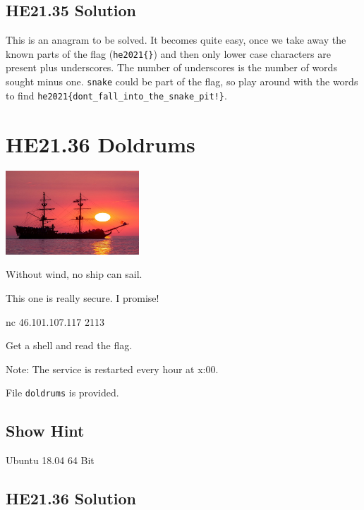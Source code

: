 \documentclass[english,a4paper,nols,noindent]{tufte-handout}
\begin{document}
\hypertarget{he21.35-solution}{%
\subsection{HE21.35 Solution}\label{he21.35-solution}}

\noindent This is an anagram to be solved.
It becomes quite easy, once we take away the known parts of the flag
(\verb+he2021{}+) and then only lower case characters are present plus
underscores.  The number of underscores is the number of words sought minus
one.  \verb+snake+ could be part of the flag, so play around with the words to find
\verb+he2021{dont_fall_into_the_snake_pit!}+.



\hypertarget{he21.36}{%
\section{HE21.36 Doldrums}
  \label{he21.36}}
\begin{marginfigure}
    \includegraphics[width=50mm]{images/challenge36.jpg}
\end{marginfigure}

\noindent Without wind, no ship can sail.

This one is really secure. I promise!

nc 46.101.107.117 2113

Get a shell and read the flag.

Note: The service is restarted every hour at x:00.

File \verb+doldrums+ is provided.

\subsection{Show Hint}
Ubuntu 18.04 64 Bit

\hypertarget{he21.36-solution}{%
\subsection{HE21.36 Solution}\label{he21.36-solution}}

\noindent 
\end{document}
